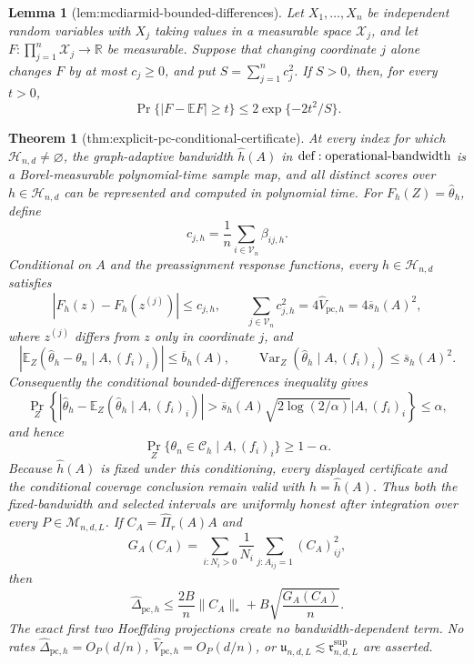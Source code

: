 \documentclass{article}
\newtheorem{theorem}{Theorem}
\newtheorem{lemma}{Lemma}
\begin{document}
\begin{lemma}[lem:mcdiarmid-bounded-differences]\label{lem:mcdiarmid-bounded-differences}
Let \(X_1,\ldots,X_n\) be independent random variables with \(X_j\) taking values in a measurable space \(\mathcal X_j\), and let \(F:\prod_{j=1}^n\mathcal X_j\to\mathbb R\) be measurable.  Suppose that changing coordinate \(j\) alone changes \(F\) by at most \(c_j\geq0\), and put \(S=\sum_{j=1}^nc_j^2\).  If \(S>0\), then, for every \(t>0\),
\[
 \Pr\{|F-\mathbb EF|\geq t\}\leq2\exp\{-2t^2/S\}.
\]
\end{lemma}

\begin{theorem}[thm:explicit-pc-conditional-certificate]\label{thm:explicit-pc-conditional-certificate}
At every index for which \(\mathcal H_{n,d}\ne\varnothing\), the graph-adaptive bandwidth \(\widehat h(A)\) in \({\rm def:operational\text{-}bandwidth}\) is a Borel-measurable polynomial-time sample map, and all distinct scores over \(h\in\mathcal H_{n,d}\) can be represented and computed in polynomial time.  For \(F_h(Z)=\widehat\theta_h\), define
\[
 c_{j,h}=\frac1n\sum_{i\in\mathcal V_n}\beta_{ij,h}.
\]
Conditional on \(A\) and the preassignment response functions, every \(h\in\mathcal H_{n,d}\) satisfies
\[
 |F_h(z)-F_h(z^{(j)})|\leq c_{j,h},
 \qquad
 \sum_{j\in\mathcal V_n}c_{j,h}^2
 =4\widehat V_{\mathrm{pc},h}=4\overline s_h(A)^2,
\]
where \(z^{(j)}\) differs from \(z\) only in coordinate \(j\), and
\[
 \left|\mathbb E_Z(\widehat\theta_h-\theta_n\mid A,(f_i)_i)\right|
 \leq\overline b_h(A),
 \qquad
 \operatorname{Var}_Z(\widehat\theta_h\mid A,(f_i)_i)
 \leq\overline s_h(A)^2.
\]
Consequently the conditional bounded-differences inequality gives
\[
 \Pr_Z\!\left\{
 |\widehat\theta_h-\mathbb E_Z(\widehat\theta_h\mid A,(f_i)_i)|
 >\overline s_h(A)\sqrt{2\log(2/\alpha)}
 \mathrel{\Big|}A,(f_i)_i\right\}\leq\alpha,
\]
and hence
\[
 \Pr_Z\{\theta_n\in\mathcal C_h\mid A,(f_i)_i\}\geq1-\alpha.
\]
Because \(\widehat h(A)\) is fixed under this conditioning, every displayed certificate and the conditional coverage conclusion remain valid with \(h=\widehat h(A)\).  Thus both the fixed-bandwidth and selected intervals are uniformly honest after integration over every \(P\in\mathcal M_{n,d,L}\).  If \(C_A=\widehat\Pi_r(A)A\) and
\[
 G_A(C_A)=\sum_{i:N_i>0}\frac1{N_i}\sum_{j:A_{ij}=1}(C_A)_{ij}^2,
\]
then
\[
 \widehat\Delta_{\mathrm{pc},h}
 \leq \frac{2B}{n}\|C_A\|_*
      +B\sqrt{\frac{G_A(C_A)}{n}}.
\]
The exact first two Hoeffding projections create no bandwidth-dependent term.  No rates \(\widehat\Delta_{\mathrm{pc},h}=O_P(d/n)\), \(\widehat V_{\mathrm{pc},h}=O_P(d/n)\), or \(\mathfrak u_{n,d,L}\lesssim\mathfrak r^{\mathrm{sup}}_{n,d,L}\) are asserted.
\end{theorem}
\end{document}
